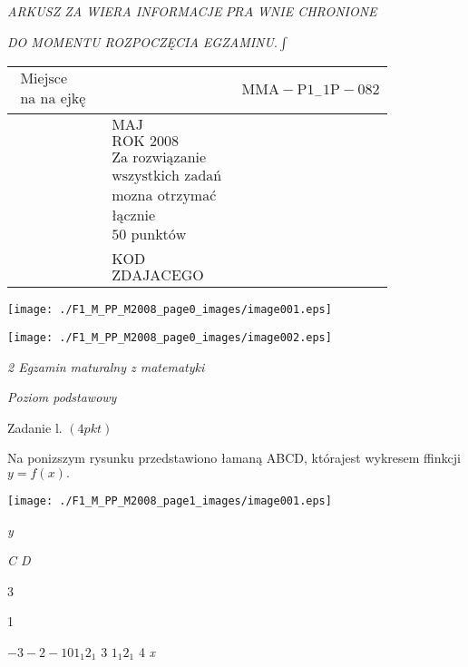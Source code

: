 \documentclass[a4paper,12pt]{article}
\begin{document}
{\it ARKUSZ ZA WIERA INFORMACJE} $PRA$ {\it WNIE CHRONIONE}

{\it DO MOMENTU ROZPOCZĘCIA EGZAMINU}.$\displaystyle \int$
\begin{center}
\begin{tabular}{|l|l|l}
\cline{1-1}
\multicolumn{1}{|l|}{$\begin{array}{l}\mbox{Miejsce}	\\	\mbox{na na ejkę}	\end{array}$}&	\multicolumn{1}{|l|}{}&	\multicolumn{1}{|l}{ $\mathrm{M}\mathrm{M}\mathrm{A}-\mathrm{P}1_{-}1\mathrm{P}-082$}	\\
\hline
&	\multicolumn{1}{|l}{$\begin{array}{l}\mbox{MAJ}	\\	\mbox{ROK 2008}	\\	\mbox{Za rozwiązanie}	\\	\mbox{wszystkich zadań}	\\	\mbox{mozna otrzymać}	\\	\mbox{łącznie}	\\	\mbox{50 punktów}	\end{array}$}	\\
\cline{3-3}
&	\multicolumn{1}{|l}{$\begin{array}{l}\mbox{KOD}	\\	\mbox{ZDAJACEGO}	\end{array}$}
\end{tabular}


\texttt{[image: ./F1\_M\_PP\_M2008\_page0\_images/image001.eps]}

\texttt{[image: ./F1\_M\_PP\_M2008\_page0\_images/image002.eps]}
\end{center}



{\it 2 Egzamin maturalny z matematyki}

{\it Poziom podstawowy}

Zadanie l. $(4pkt)$

Na ponizszym rysunku przedstawiono łamaną ABCD, którajest wykresem ffinkcji $y=f(x).$
\begin{center}
\texttt{[image: ./F1\_M\_PP\_M2008\_page1\_images/image001.eps]}
\end{center}
{\it y}

{\it C  D}

3

1

$-3 -2  -1  0 1_{1} 2_{1}$ 3  $1_{1} 2_{1}$  4  {\it x}
\end{document}
